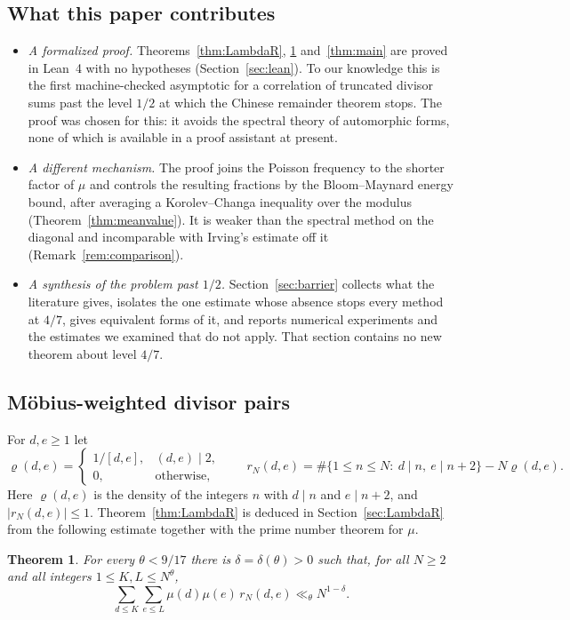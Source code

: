 \documentclass[11pt]{amsart}
\newtheorem{theorem}{Theorem}[section]
\theoremstyle{definition}
\theoremstyle{remark}
\numberwithin{equation}{section}
\begin{document}
\subsection{What this paper contributes}\label{sec:contrib}
\begin{itemize}
\item \emph{A formalized proof.}  Theorems~\ref{thm:LambdaR},
\ref{thm:level} and~\ref{thm:main} are proved in Lean~4 with no hypotheses
(Section~\ref{sec:lean}).  To our knowledge this is the first machine-checked
asymptotic for a correlation of truncated divisor sums past the level $1/2$
at which the Chinese remainder theorem stops.  The proof was chosen for
this: it avoids the spectral theory of automorphic forms, none of which is
available in a proof assistant at present.
\item \emph{A different mechanism.}  The proof joins the Poisson frequency
to the shorter factor of $\mu$ and controls the resulting fractions by the
Bloom--Maynard energy bound, after averaging a Korolev--Changa inequality
over the modulus (Theorem~\ref{thm:meanvalue}).  It is weaker than the
spectral method on the diagonal and incomparable with Irving's estimate off
it (Remark~\ref{rem:comparison}).
\item \emph{A synthesis of the problem past $1/2$.}
Section~\ref{sec:barrier} collects what the literature gives, isolates the
one estimate whose absence stops every method at $4/7$, gives equivalent
forms of it, and reports numerical experiments and the estimates we examined
that do not apply.  That section contains no new theorem about level $4/7$.
\end{itemize}

\subsection{M\"obius-weighted divisor pairs}
For $d,e\ge1$ let
\[
 \varrho(d,e)=\begin{cases}1/[d,e],&(d,e)\mid 2,\\0,&\text{otherwise},\end{cases}
 \qquad
 r_N(d,e)=\#\{1\le n\le N:\ d\mid n,\ e\mid n+2\}-N\varrho(d,e).
\]
Here $\varrho(d,e)$ is the density of the integers $n$ with $d\mid n$ and
$e\mid n+2$, and $|r_N(d,e)|\le1$.  Theorem~\ref{thm:LambdaR} is deduced
in Section~\ref{sec:LambdaR} from the following estimate together with the
prime number theorem for $\mu$.

\begin{theorem}\label{thm:level}
For every $\theta<9/17$ there is $\delta=\delta(\theta)>0$ such that, for all
$N\ge2$ and all integers $1\le K,L\le N^\theta$,
\[
 \sum_{d\le K}\sum_{e\le L}\mu(d)\mu(e)\,r_N(d,e)\ll_\theta N^{1-\delta}.
\]
\end{theorem}
\end{document}
